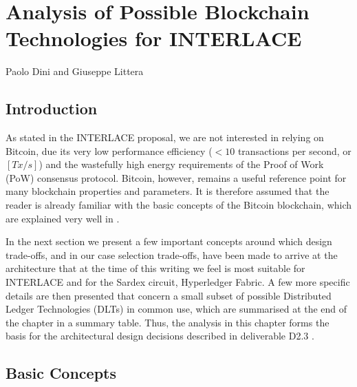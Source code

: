 \chapter{Analysis of Possible Blockchain Technologies for INTERLACE}
\label{ch:dlt}

\vspace{-1cm}
\begin{center}
Paolo Dini and Giuseppe Littera
\end{center}

\section{Introduction}
As stated in the INTERLACE proposal, we are not interested in relying on Bitcoin, due its very low performance efficiency ($< 10$ transactions per second, or $[Tx/s]$) and the wastefully high energy requirements of the Proof of Work (PoW) consensus protocol. Bitcoin, however, remains a useful reference point for many blockchain properties and parameters. It is therefore assumed that the reader is already familiar with the basic concepts of the Bitcoin blockchain, which are explained very well in \cite{Antonopoulos2015}.

In the next section we present a few important concepts around which design trade-offs, and in our case selection trade-offs, have been made to arrive at the architecture that at the time of this writing we feel is most suitable for INTERLACE and for the Sardex circuit, Hyperledger Fabric. A few more specific details are then presented that concern a small subset of possible Distributed Ledger Technologies (DLTs) in common use, which are summarised at the end of the chapter in a summary table. Thus, the analysis in this chapter forms the basis for the architectural design decisions described in deliverable D2.3 \cite{INTERLACE_D23}.

\section{Basic Concepts}
